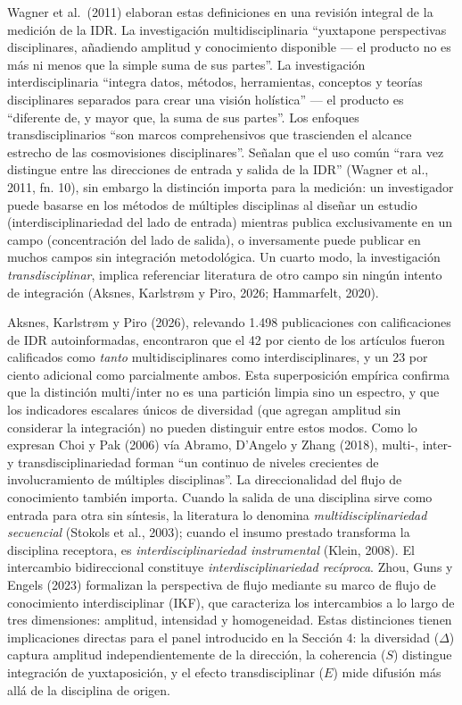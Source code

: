 \documentclass[
]{article}
\begin{document}
Wagner et al.~(2011) elaboran estas definiciones en una revisión
integral de la medición de la IDR. La investigación multidisciplinaria
``yuxtapone perspectivas disciplinares, añadiendo amplitud y
conocimiento disponible --- el producto no es más ni menos que la simple
suma de sus partes''. La investigación interdisciplinaria ``integra
datos, métodos, herramientas, conceptos y teorías disciplinares
separados para crear una visión holística'' --- el producto es
``diferente de, y mayor que, la suma de sus partes''. Los enfoques
transdisciplinarios ``son marcos comprehensivos que trascienden el
alcance estrecho de las cosmovisiones disciplinares''. Señalan que el
uso común ``rara vez distingue entre las direcciones de entrada y salida
de la IDR'' (Wagner et al., 2011, fn. 10), sin embargo la distinción
importa para la medición: un investigador puede basarse en los métodos
de múltiples disciplinas al diseñar un estudio (interdisciplinariedad
del lado de entrada) mientras publica exclusivamente en un campo
(concentración del lado de salida), o inversamente puede publicar en
muchos campos sin integración metodológica. Un cuarto modo, la
investigación \emph{transdisciplinar}, implica referenciar literatura de
otro campo sin ningún intento de integración (Aksnes, Karlstrøm y Piro,
2026; Hammarfelt, 2020).

Aksnes, Karlstrøm y Piro (2026), relevando 1.498 publicaciones con
calificaciones de IDR autoinformadas, encontraron que el 42 por ciento
de los artículos fueron calificados como \emph{tanto} multidisciplinares
como interdisciplinares, y un 23 por ciento adicional como parcialmente
ambos. Esta superposición empírica confirma que la distinción
multi/inter no es una partición limpia sino un espectro, y que los
indicadores escalares únicos de diversidad (que agregan amplitud sin
considerar la integración) no pueden distinguir entre estos modos. Como
lo expresan Choi y Pak (2006) vía Abramo, D'Angelo y Zhang (2018),
multi-, inter- y transdisciplinariedad forman ``un continuo de niveles
crecientes de involucramiento de múltiples disciplinas''. La
direccionalidad del flujo de conocimiento también importa. Cuando la
salida de una disciplina sirve como entrada para otra sin síntesis, la
literatura lo denomina \emph{multidisciplinariedad secuencial} (Stokols
et al., 2003); cuando el insumo prestado transforma la disciplina
receptora, es \emph{interdisciplinariedad instrumental} (Klein, 2008).
El intercambio bidireccional constituye \emph{interdisciplinariedad
recíproca}. Zhou, Guns y Engels (2023) formalizan la perspectiva de
flujo mediante su marco de flujo de conocimiento interdisciplinar (IKF),
que caracteriza los intercambios a lo largo de tres dimensiones:
amplitud, intensidad y homogeneidad. Estas distinciones tienen
implicaciones directas para el panel introducido en la Sección 4: la
diversidad (\(\Delta\)) captura amplitud independientemente de la
dirección, la coherencia (\(S\)) distingue integración de yuxtaposición,
y el efecto transdisciplinar (\(E\)) mide difusión más allá de la
disciplina de origen.
\end{document}
